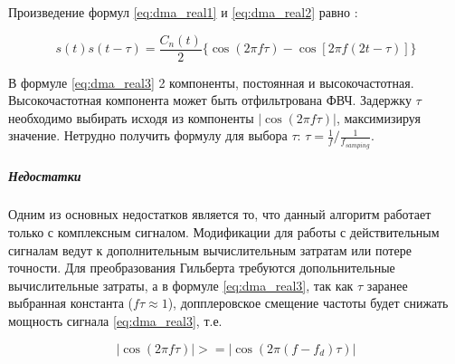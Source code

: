 Произведение формул \ref{eq:dma_real1} и \ref{eq:dma_real2} равно \cite{tsui}:
\begin{center}
\begin{equation}
	\label{eq:dma_real3}
	s(t)s(t - \tau) = \frac{C_n(t)}{2} \{\cos (2\pi f \tau) - \cos [2 \pi f (2t - \tau)]\}
\end{equation}
\end{center}

В формуле \ref{eq:dma_real3} 2 компоненты, постоянная и высокочастотная. Высокочастотная компонента
может быть отфильтрована ФВЧ. Задержку ${\tau}$ необходимо выбирать исходя из компоненты ${\left| \cos (2\pi f \tau) \right|}$,
максимизируя значение. Нетрудно получить формулу для выбора ${\tau}$: ${\tau = \frac{1}{f} / \frac{1}{f_{samping}}}$.

\subparagraph{Недостатки}

Одним из основных недостатков является то, что данный алгоритм работает только с комплексным сигналом. Модификации
для работы с действительным сигналам ведут к дополнительным вычислительным затратам или потере точности. Для
преобразования Гильберта требуются допольнительные вычислительные затраты, а в формуле \ref{eq:dma_real3}, так
как ${\tau}$ заранее выбранная константа (${f\tau \approx 1}$), допплеровское смещение частоты будет снижать мощность
сигнала \ref{eq:dma_real3}, т.е.
\begin{center}
\begin{equation}
	\left| \cos (2\pi f \tau) \right| >= \left| \cos (2\pi (f - f_d) \tau) \right|
\end{equation}
\end{center}

\newpage
